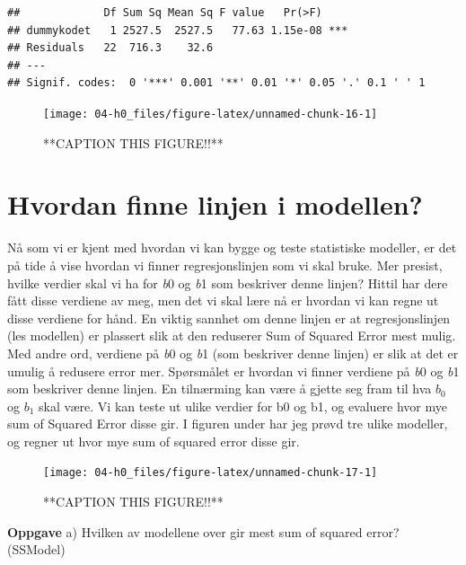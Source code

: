 \documentclass[
]{book}
\begin{document}
\begin{verbatim}
##             Df Sum Sq Mean Sq F value   Pr(>F)    
## dummykodet   1 2527.5  2527.5   77.63 1.15e-08 ***
## Residuals   22  716.3    32.6                     
## ---
## Signif. codes:  0 '***' 0.001 '**' 0.01 '*' 0.05 '.' 0.1 ' ' 1
\end{verbatim}

\begin{figure}

{\centering \texttt{[image: 04-h0\_files/figure-latex/unnamed-chunk-16-1]} 

}

\caption{**CAPTION THIS FIGURE!!**}\label{fig:unnamed-chunk-16}
\end{figure}

\hypertarget{hvordan-finne-linjen-i-modellen}{%
\section{Hvordan finne linjen i modellen?}\label{hvordan-finne-linjen-i-modellen}}

Nå som vi er kjent med hvordan vi kan bygge og teste statistiske modeller, er det på tide å vise hvordan vi finner regresjonslinjen som vi skal bruke. Mer presist, hvilke verdier skal vi ha for \emph{b}0 og \emph{b}1 som beskriver denne linjen? Hittil har dere fått disse verdiene av meg, men det vi skal lære nå er hvordan vi kan regne ut disse verdiene for hånd. En viktig sannhet om denne linjen er at regresjonslinjen (les modellen) er plassert slik at den reduserer Sum of Squared Error mest mulig. Med andre ord, verdiene på \emph{b}0 og \emph{b}1 (som beskriver denne linjen) er slik at det er umulig å redusere error mer. Spørsmålet er hvordan vi finner verdiene på \emph{b}0 og \emph{b}1 som beskriver denne linjen. En tilnærming kan være å gjette seg fram til hva \(b_0\) og \(b_1\) skal være. Vi kan teste ut ulike verdier for b0 og b1, og evaluere hvor mye sum of Squared Error disse gir. I figuren under har jeg prøvd tre ulike modeller, og regner ut hvor mye sum of squared error disse gir.

\begin{figure}

{\centering \texttt{[image: 04-h0\_files/figure-latex/unnamed-chunk-17-1]} 

}

\caption{**CAPTION THIS FIGURE!!**}\label{fig:unnamed-chunk-17}
\end{figure}

\textbf{Oppgave}
a) Hvilken av modellene over gir mest sum of squared error? (SSModel)
\end{document}
